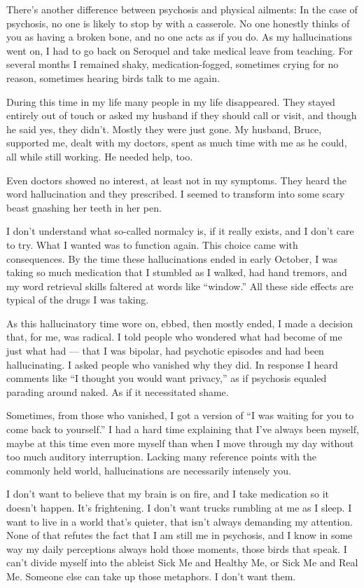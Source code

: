 There's another difference between psychosis and physical ailments: In
the case of psychosis, no one is likely to stop by with a casserole. No
one honestly thinks of you as having a broken bone, and no one acts as
if you do. As my hallucinations went on, I had to go back on Seroquel
and take medical leave from teaching. For several months I remained
shaky, medication-fogged, sometimes crying for no reason, sometimes
hearing birds talk to me again.

During this time in my life many people in my life disappeared. They
stayed entirely out of touch or asked my husband if they should call or
visit, and though he said yes, they didn't. Mostly they were just gone.
My husband, Bruce, supported me, dealt with my doctors, spent as much
time with me as he could, all while still working. He needed help, too.

Even doctors showed no interest, at least not in my symptoms. They heard
the word hallucination and they prescribed. I seemed to transform into
some scary beast gnashing her teeth in her pen.

I don't understand what so-called normalcy is, if it really exists, and
I don't care to try. What I wanted was to function again. This choice
came with consequences. By the time these hallucinations ended in early
October, I was taking so much medication that I stumbled as I walked,
had hand tremors, and my word retrieval skills faltered at words like
``window.'' All these side effects are typical of the drugs I was
taking.

As this hallucinatory time wore on, ebbed, then mostly ended, I made a
decision that, for me, was radical. I told people who wondered what had
become of me just what had --- that I was bipolar, had psychotic
episodes and had been hallucinating. I asked people who vanished why
they did. In response I heard comments like ``I thought you would want
privacy,'' as if psychosis equaled parading around naked. As if it
necessitated shame.

Sometimes, from those who vanished, I got a version of ``I was waiting
for you to come back to yourself.'' I had a hard time explaining that
I've always been myself, maybe at this time even more myself than when I
move through my day without too much auditory interruption. Lacking many
reference points with the commonly held world, hallucinations are
necessarily intensely you.

I don't want to believe that my brain is on fire, and I take medication
so it doesn't happen. It's frightening. I don't want trucks rumbling at
me as I sleep. I want to live in a world that's quieter, that isn't
always demanding my attention. None of that refutes the fact that I am
still me in psychosis, and I know in some way my daily perceptions
always hold those moments, those birds that speak. I can't divide myself
into the ableist Sick Me and Healthy Me, or Sick Me and Real Me. Someone
else can take up those metaphors. I don't want them.

